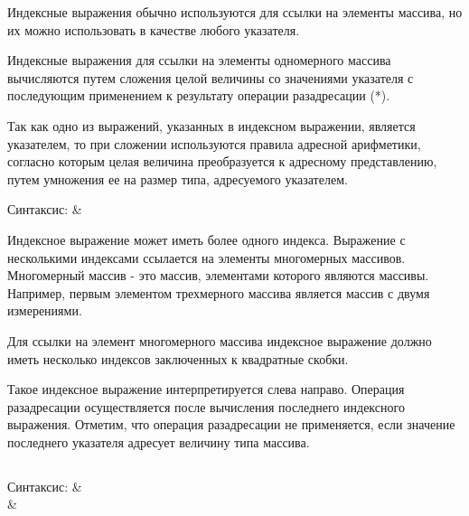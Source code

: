 Индексные выражения обычно используются для ссылки на элементы массива, но их можно использовать в качестве любого указателя.  \killoverfullbefore 

Индексные выражения для ссылки на элементы одномерного массива вычисляются путем сложения целой величины со значениями указателя с последующим применением к результату операции разадресации (*). \killoverfullbefore 

Так как одно из выражений, указанных в индексном выражении, является указателем, то при сложении используются правила адресной арифметики, согласно которым целая величина преобразуется к адресному представлению, путем умножения ее на размер типа, адресуемого указателем.\killoverfullbefore \BL

\clearpage

 \BL

\begin{pHeader}
Синтаксис:      & \\
\end{pHeader}

Индексное выражение может иметь более одного индекса. Выражение с несколькими индексами ссылается на элементы многомерных массивов. Многомерный массив - это массив, элементами которого являются массивы. Например, первым элементом трехмерного массива является массив с двумя измерениями. \killoverfullbefore

Для ссылки на элемент многомерного массива индексное выражение должно иметь несколько индексов заключенных к квадратные скобки.\killoverfullbefore

Такое индексное выражение интерпретируется слева направо. Операция разадресации осуществляется после вычисления последнего индексного выражения. Отметим, что операция разадресации не применяется, если значение последнего указателя адресует величину типа массива. \killoverfullbefore

\subsection{}

\begin{pHeader}
Синтаксис:      & \\
                & \\
\end{pHeader}

